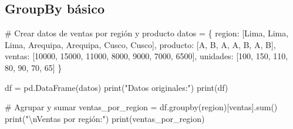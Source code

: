 \documentclass[
  doc,
  floatsintext,
  longtable,
  a4paper,
  nolmodern,
  notxfonts,
  notimes,
  12pt,
  colorlinks=true,linkcolor=blue,citecolor=blue,urlcolor=blue]{apa7}
\newenvironment{Shaded}{\begin{snugshade}}{\end{snugshade}}
\newcommand{\BuiltInTok}[1]{\textcolor[rgb]{0.00,0.23,0.31}{#1}}
\newcommand{\CharTok}[1]{\textcolor[rgb]{0.13,0.47,0.30}{#1}}
\newcommand{\CommentTok}[1]{\textcolor[rgb]{0.37,0.37,0.37}{#1}}
\newcommand{\DecValTok}[1]{\textcolor[rgb]{0.68,0.00,0.00}{#1}}
\newcommand{\NormalTok}[1]{\textcolor[rgb]{0.00,0.23,0.31}{#1}}
\newcommand{\OperatorTok}[1]{\textcolor[rgb]{0.37,0.37,0.37}{#1}}
\newcommand{\StringTok}[1]{\textcolor[rgb]{0.13,0.47,0.30}{#1}}
\begin{document}
\subsection{GroupBy básico}\label{groupby-buxe1sico}

\begin{Shaded}
\begin{Highlighting}[]
\CommentTok{\# Crear datos de ventas por región y producto}
\NormalTok{datos }\OperatorTok{=}\NormalTok{ \{}
    \StringTok{\textquotesingle{}region\textquotesingle{}}\NormalTok{: [}\StringTok{\textquotesingle{}Lima\textquotesingle{}}\NormalTok{, }\StringTok{\textquotesingle{}Lima\textquotesingle{}}\NormalTok{, }\StringTok{\textquotesingle{}Lima\textquotesingle{}}\NormalTok{, }\StringTok{\textquotesingle{}Arequipa\textquotesingle{}}\NormalTok{, }\StringTok{\textquotesingle{}Arequipa\textquotesingle{}}\NormalTok{, }\StringTok{\textquotesingle{}Cusco\textquotesingle{}}\NormalTok{, }\StringTok{\textquotesingle{}Cusco\textquotesingle{}}\NormalTok{],}
    \StringTok{\textquotesingle{}producto\textquotesingle{}}\NormalTok{: [}\StringTok{\textquotesingle{}A\textquotesingle{}}\NormalTok{, }\StringTok{\textquotesingle{}B\textquotesingle{}}\NormalTok{, }\StringTok{\textquotesingle{}A\textquotesingle{}}\NormalTok{, }\StringTok{\textquotesingle{}A\textquotesingle{}}\NormalTok{, }\StringTok{\textquotesingle{}B\textquotesingle{}}\NormalTok{, }\StringTok{\textquotesingle{}A\textquotesingle{}}\NormalTok{, }\StringTok{\textquotesingle{}B\textquotesingle{}}\NormalTok{],}
    \StringTok{\textquotesingle{}ventas\textquotesingle{}}\NormalTok{: [}\DecValTok{10000}\NormalTok{, }\DecValTok{15000}\NormalTok{, }\DecValTok{11000}\NormalTok{, }\DecValTok{8000}\NormalTok{, }\DecValTok{9000}\NormalTok{, }\DecValTok{7000}\NormalTok{, }\DecValTok{6500}\NormalTok{],}
    \StringTok{\textquotesingle{}unidades\textquotesingle{}}\NormalTok{: [}\DecValTok{100}\NormalTok{, }\DecValTok{150}\NormalTok{, }\DecValTok{110}\NormalTok{, }\DecValTok{80}\NormalTok{, }\DecValTok{90}\NormalTok{, }\DecValTok{70}\NormalTok{, }\DecValTok{65}\NormalTok{]}
\NormalTok{\}}

\NormalTok{df }\OperatorTok{=}\NormalTok{ pd.DataFrame(datos)}
\BuiltInTok{print}\NormalTok{(}\StringTok{"Datos originales:"}\NormalTok{)}
\BuiltInTok{print}\NormalTok{(df)}

\CommentTok{\# Agrupar y sumar}
\NormalTok{ventas\_por\_region }\OperatorTok{=}\NormalTok{ df.groupby(}\StringTok{\textquotesingle{}region\textquotesingle{}}\NormalTok{)[}\StringTok{\textquotesingle{}ventas\textquotesingle{}}\NormalTok{].}\BuiltInTok{sum}\NormalTok{()}
\BuiltInTok{print}\NormalTok{(}\StringTok{"}\CharTok{\textbackslash{}n}\StringTok{Ventas por región:"}\NormalTok{)}
\BuiltInTok{print}\NormalTok{(ventas\_por\_region)}


\end{Highlighting}
\end{Shaded}
\end{document}

